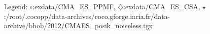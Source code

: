 Legend: {\color{NavyBlue}$\circ$}:exdata/CMA\_ES\_PPMF, {\color{Magenta}$\diamondsuit$}:exdata/CMA\_ES\_CSA, {\color{Orange}$\star$}:/root/.cocopp/data-archives/coco.gforge.inria.fr/data-archive/bbob/2012/CMAES\_posik\_noiseless.tgz